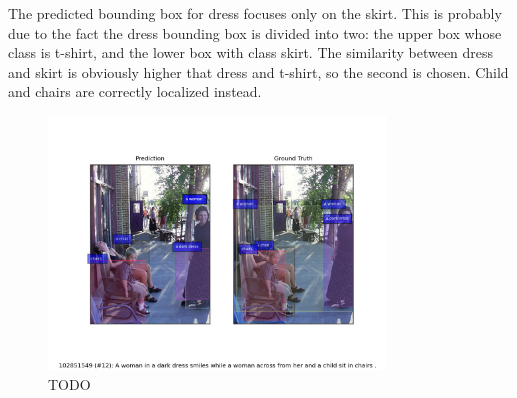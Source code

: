 The predicted bounding box for dress focuses only on the skirt. This
is probably due to the fact the dress bounding box is divided into
two: the upper box whose class is t-shirt, and the lower box with
class skirt. The similarity between dress and skirt is obviously
higher that dress and t-shirt, so the second is chosen. Child and
chairs are correctly localized instead.

\begin{figure}
  \includegraphics[width=0.8\textwidth]{figures/similing-woman.png}
  \caption{TODO}
  \label{fig:qualitative-results}
\end{figure}
